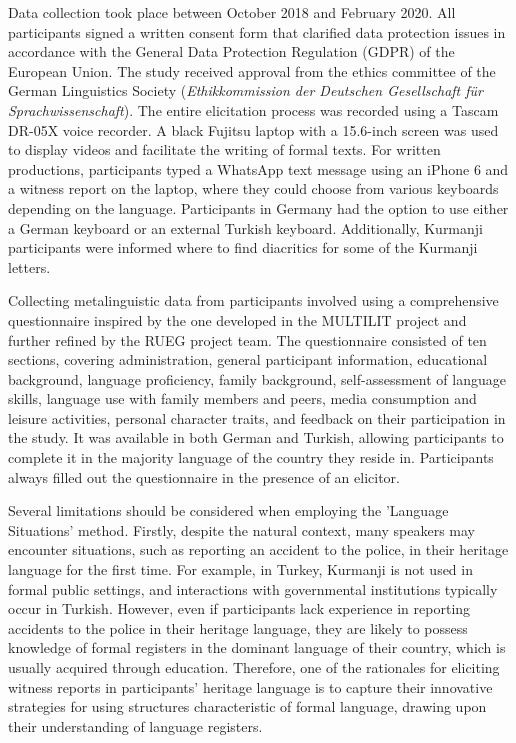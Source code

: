 Data collection took place between October 2018 and February 2020. All participants signed a written consent form that clarified data protection issues in accordance with the General Data Protection Regulation (GDPR) of the European Union. The study received approval from the ethics committee of the German Linguistics Society (\textit{Ethikkommission der Deutschen Gesellschaft für Sprachwissenschaft}). The entire elicitation process was recorded using a Tascam DR-05X voice recorder. A black Fujitsu laptop with a 15.6-inch screen was used to display videos and facilitate the writing of formal texts. For written productions, participants typed a WhatsApp text message using an iPhone 6 and a witness report on the laptop, where they could choose from various keyboards depending on the language. Participants in Germany had the option to use either a German keyboard or an external Turkish keyboard. Additionally, Kurmanji participants were informed where to find diacritics for some of the Kurmanji letters.

Collecting metalinguistic data from participants involved using a comprehensive questionnaire inspired by the one developed in the MULTILIT project \citep{SchroederEtAl2015} and further refined by the RUEG project team. The questionnaire consisted of ten sections, covering administration, general participant information, educational background, language proficiency, family background, self-assessment of language skills, language use with family members and peers, media consumption and leisure activities, personal character traits, and feedback on their participation in the study. It was available in both German and Turkish, allowing participants to complete it in the majority language of the country they reside in. Participants always filled out the questionnaire in the presence of an elicitor.

Several limitations should be considered when employing the 'Language Situations' method. Firstly, despite the natural context, many speakers may encounter situations, such as reporting an accident to the police, in their heritage language for the first time. For example, in Turkey, Kurmanji is not used in formal public settings, and interactions with governmental institutions typically occur in Turkish. However, even if participants lack experience in reporting accidents to the police in their heritage language, they are likely to possess knowledge of formal registers in the dominant language of their country, which is usually acquired through education. Therefore, one of the rationales for eliciting witness reports in participants’ heritage language is to capture their innovative strategies for using structures characteristic of formal language, drawing upon their understanding of language registers.

